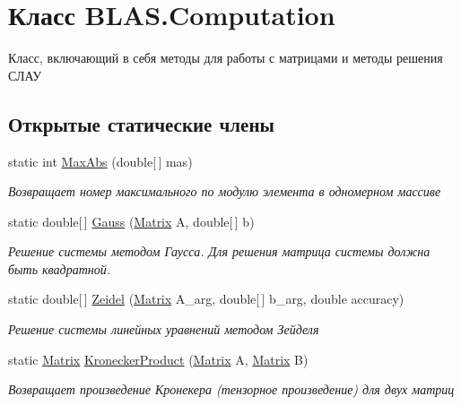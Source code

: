 \hypertarget{class_b_l_a_s_1_1_computation}{}\section{Класс B\+L\+A\+S.\+Computation}
\label{class_b_l_a_s_1_1_computation}


Класс, включающий в себя методы для работы с матрицами и методы решения СЛАУ  


\subsection*{Открытые статические члены}
\begin{DoxyCompactItemize}
\item 
static int \hyperlink{class_b_l_a_s_1_1_computation_a6b1d14ddde137052891ae426962a495d}{Max\+Abs} (double\mbox{[}$\,$\mbox{]} mas)
\begin{DoxyCompactList}\small\item\em Возвращает номер максимального по модулю элемента в одномерном массиве \end{DoxyCompactList}\item 
static double\mbox{[}$\,$\mbox{]} \hyperlink{class_b_l_a_s_1_1_computation_ac30bde9ba0a8f983730daa3fa0318e29}{Gauss} (\hyperlink{class_b_l_a_s_1_1_matrix}{Matrix} A, double\mbox{[}$\,$\mbox{]} b)
\begin{DoxyCompactList}\small\item\em Решение системы методом Гаусса. Для решения матрица системы должна быть квадратной. \end{DoxyCompactList}\item 
static double\mbox{[}$\,$\mbox{]} \hyperlink{class_b_l_a_s_1_1_computation_aec73d3c3fa06792481c838baf85297cc}{Zeidel} (\hyperlink{class_b_l_a_s_1_1_matrix}{Matrix} A\+\_\+arg, double\mbox{[}$\,$\mbox{]} b\+\_\+arg, double accuracy)
\begin{DoxyCompactList}\small\item\em Решение системы линейных уравнений методом Зейделя \end{DoxyCompactList}\item 
static \hyperlink{class_b_l_a_s_1_1_matrix}{Matrix} \hyperlink{class_b_l_a_s_1_1_computation_a51aa0363d37030a35bcd43cfe86599c1}{Kronecker\+Product} (\hyperlink{class_b_l_a_s_1_1_matrix}{Matrix} A, \hyperlink{class_b_l_a_s_1_1_matrix}{Matrix} B)
\begin{DoxyCompactList}\small\item\em Возвращает произведение Кронекера (тензорное произведение) для двух матриц \end{DoxyCompactList}\item 

\end{DoxyCompactItemize}

